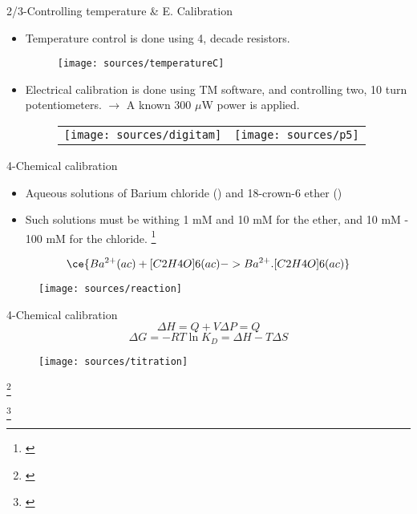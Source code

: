 \documentclass[handout]{beamer}
\newcommand\blfootnote[1]
{%
	\begingroup
	\renewcommand\thefootnote{}\footnote{#1}%
	\addtocounter{footnote}{-1}%
	\endgroup
}
\newcommand{\fcite}[1]{\blfootnote{\cite{#1}}}
\begin{document}
\begin{frame}{2/3-Controlling temperature \& E. Calibration}
	\begin{itemize}
		\item Temperature control is done using 4, decade resistors.
		\begin{figure}[h]
			\texttt{[image: sources/temperatureC]}
		\end{figure}
		\item Electrical calibration is done using TM software, and controlling two, 10 turn potentiometers. $\longrightarrow$ A known 300 $\mu$W power is applied.
		\begin{figure}[h]
			\centering
			\begin{tabular}{cc}
				\texttt{[image: sources/digitam]} &
				\texttt{[image: sources/p5]}
			\end{tabular}
		\end{figure}
	\end{itemize}
\end{frame}

\begin{frame}{4-Chemical calibration}
	\begin{itemize}
		\item Aqueous solutions of Barium chloride () and 18-crown-6 ether ()
		\item Such solutions must be withing 1 mM and 10 mM for the ether, and 10 mM - 100 mM for the chloride. \fcite{mizoue2004calorimetric}
	\end{itemize}

	\begin{equation}
		\ce{Ba^{2+}(ac) + [C2H4O]6(ac) -> Ba^{2+}.[C2H4O]6(ac)}
	\end{equation}
	\begin{figure}[h]
		\centering
		\texttt{[image: sources/reaction]}
	\end{figure}
	
\end{frame}

\begin{frame}{4-Chemical calibration}
	\begin{equation}
		\Delta H = Q + V\Delta P = Q
	\end{equation}
	\begin{equation}
		\Delta G = -RT\ln K_D = \Delta H - T\Delta S
	\end{equation}
	\begin{figure}[h]
		\centering
		\texttt{[image: sources/titration]}
	\end{figure}	
	\fcite{tellinghuisen2007optimizing}
	\fcite{wadso2003new}
\end{frame}
\end{document}

